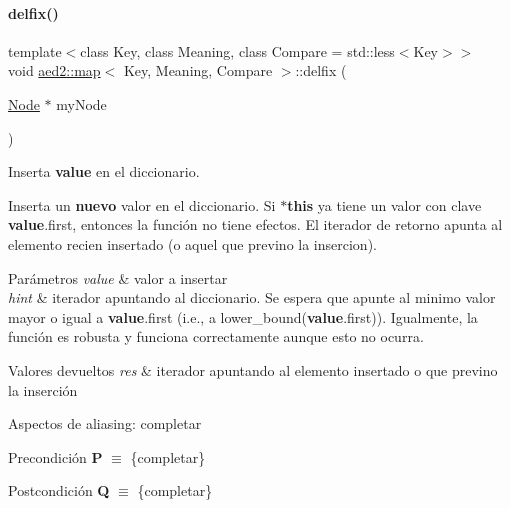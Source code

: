 \paragraph{\texorpdfstring{delfix()}{delfix()}}
{\footnotesize\ttfamily template$<$class Key, class Meaning, class Compare = std\+::less$<$\+Key$>$$>$ \\
void \hyperlink{classaed2_1_1map}{aed2\+::map}$<$ Key, Meaning, Compare $>$\+::delfix (\begin{DoxyParamCaption}\item[{\hyperlink{structaed2_1_1map_1_1Node}{Node} $\ast$}]{my\+Node }\end{DoxyParamCaption})\hspace{0.3cm}{\ttfamily [inline]}}



Inserta {\bfseries value} en el diccionario. 

Inserta un {\bfseries nuevo} valor en el diccionario. Si {\bfseries $\ast$this} ya tiene un valor con clave {\bfseries value}.first, entonces la función no tiene efectos. El iterador de retorno apunta al elemento recien insertado (o aquel que previno la insercion).


\begin{DoxyParams}{Parámetros}
{\em value} & valor a insertar \\
\hline
{\em hint} & iterador apuntando al diccionario. Se espera que apunte al minimo valor mayor o igual a {\bfseries value}.first (i.\+e., a lower\+\_\+bound({\bfseries value}.first)). Igualmente, la función es robusta y funciona correctamente aunque esto no ocurra. \\
\hline
\end{DoxyParams}

\begin{DoxyRetVals}{Valores devueltos}
{\em res} & iterador apuntando al elemento insertado o que previno la inserción\\
\hline
\end{DoxyRetVals}
\begin{DoxyParagraph}{Aspectos de aliasing\+:}
completar
\end{DoxyParagraph}
\begin{DoxyPrecond}{Precondición}
{\bfseries P} $\equiv$ \{completar\} 
\end{DoxyPrecond}
\begin{DoxyPostcond}{Postcondición}
{\bfseries Q} $\equiv$ \{completar\}
\end{DoxyPostcond}

